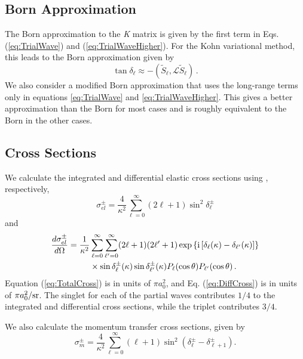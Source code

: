 \documentclass[preprint,showpacs,preprintnumbers,amsmath,amssymb]{revtex4}
\newcommand{\ii}{{\rm{i}}}
\begin{document}
\subsection{Born Approximation}
The Born approximation to the \emph{K} matrix \citep[p. 620]{Bransden2003} is given by the first term in Eqs. (\ref{eq:TrialWave}) and (\ref{eq:TrialWaveHigher}). For the Kohn variational method, this leads to the Born approximation given by
\begin{equation}
\label{eq:Born}
\tan\delta_\ell \approx -(\widetilde{S}_\ell,\mathcal{L}\widetilde{S}_\ell )\, .
\end{equation}
We also consider a modified Born approximation that uses the long-range terms only in equations \ref{eq:TrialWave} and \ref{eq:TrialWaveHigher}. This gives a better approximation than the Born for most cases and is roughly equivalent to the Born in the other cases.

\subsection{Cross Sections}

We calculate the integrated and differential elastic cross sections using \cite{Bransden2003}, respectively,
\begin{equation}
\label{eq:TotalCross}
\sigma_{el}^\pm = \frac{4}{\kappa^2} \sum_{\ell=0}^\infty (2\ell+1) \sin^2 \delta_\ell^\pm
\end{equation}
and
\begin{align}
\label{eq:DiffCross}
\nonumber \frac{d\sigma_{el}^\pm}{d\Omega} = \frac{1}{\kappa^2} & \sum_{\ell=0}^\infty \sum_{\ell^\prime=0}^\infty (2\ell+1)(2\ell^\prime+1) \exp\left\{\ii \left[\delta_\ell(\kappa) - \delta_{\ell^\prime}(\kappa) \right] \right\} \\
& \times \sin\delta_\ell^\pm(\kappa) \sin\delta_{\ell^\prime}^\pm(\kappa) P_\ell(\cos\theta) P_{\ell^\prime}(\cos\theta)\,.
\end{align}
Equation (\ref{eq:TotalCross}) is in units of $\pi a_0^2$, and Eq. (\ref{eq:DiffCross}) is in units of $\pi a_0^2 / \rm{sr}$. The singlet for each of the partial waves contributes $1/4$ to the integrated and differential cross sections, while the triplet contributes $3/4$.

We also calculate the momentum transfer cross sections, given by \cite{}
\begin{equation}
\label{eq:MomentumCross}
\sigma_{m}^\pm = \frac{4}{\kappa^2} \sum_{\ell=0}^\infty (\ell+1) \sin^2 (\delta_\ell^\pm - \delta_{\ell+1}^\pm) .
\end{equation}
\end{document}
